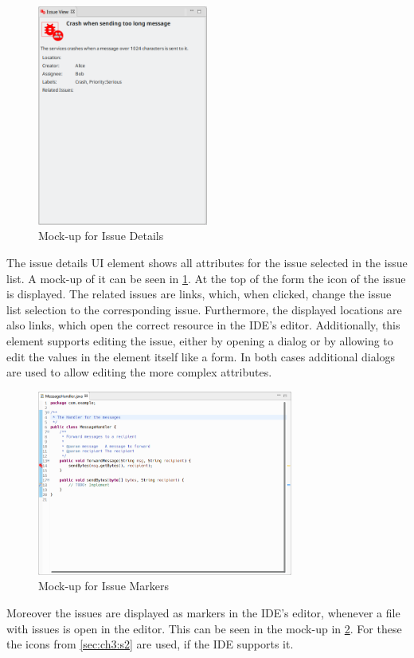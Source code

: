 \begin{figure}[!h]
	\centering
	\includegraphics[width=0.5\textwidth]{graphics/concept_mockup_issueDetails.png}
	\caption{Mock-up for Issue Details}
	\label{fig:c3:mockup_issueDetails}
\end{figure}
The issue details \gls{UI} element shows all attributes for the issue selected in the issue list.
A mock-up of it can be seen in \cref{fig:c3:mockup_issueDetails}.
At the top of the form the icon of the issue is displayed.
The related issues are links, which, when clicked, change the issue list selection to the corresponding issue.
Furthermore, the displayed locations are also links, which open the correct resource in the \gls{IDE}'s editor.
Additionally, this element supports editing the issue, either by opening a dialog or by allowing to edit the values in the element itself like a form.
In both cases additional dialogs are used to allow editing the more complex attributes. 

\begin{figure}[!h]
	\centering
	\includegraphics[width=0.75\textwidth]{graphics/concept_mockup_issueMarker.png}
	\caption{Mock-up for Issue Markers}
	\label{fig:c3:mockup_issueMarkers}
\end{figure}
Moreover the issues are displayed as markers in the \gls{IDE}'s editor, whenever a file with issues is open in the editor.
This can be seen in the mock-up in \cref{fig:c3:mockup_issueMarkers}. 
For these the icons from \cref{sec:ch3:s2} are used, if the \gls{IDE} supports it.

